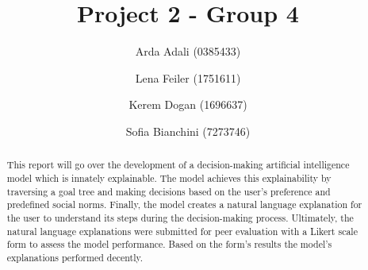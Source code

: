 \documentclass[sigconf,nonacm]{acmart}
\begin{document}
\title{Project 2 - Group 4}


\author{Arda Adali (0385433)}

\author{Lena Feiler (1751611)}

\author{Kerem Dogan (1696637)}

\author{Sofia Bianchini (7273746)}


\renewcommand{\shortauthors}{Trovato et al.}

\begin{abstract}
This report will go over the development of a decision-making artificial intelligence model which is innately explainable. The model achieves this explainability by traversing a goal tree and making decisions based on the user's preference and predefined social norms. Finally, the model creates a natural language explanation for the user to understand its steps during the decision-making process. Ultimately, the natural language explanations were submitted for peer evaluation with a Likert scale form to assess the model performance. Based on the form's results the model's explanations performed decently.
\end{abstract}
\end{document}
